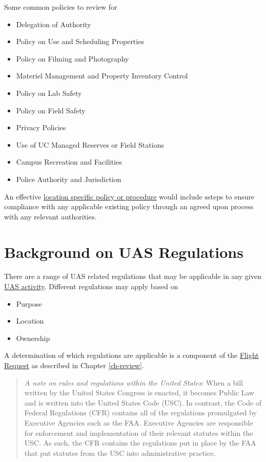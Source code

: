 \documentclass[
]{book}
\providecommand{\tightlist}{%
  \setlength{\itemsep}{0pt}\setlength{\parskip}{0pt}}
\begin{document}
Some common policies to review for

\begin{itemize}
\tightlist
\item
  Delegation of Authority
\item
  Policy on Use and Scheduling Properties
\item
  Policy on Filming and Photography
\item
  Materiel Management and Property Inventory Control
\item
  Policy on Lab Safety
\item
  Policy on Field Safety
\item
  Privacy Policies
\item
  Use of UC Managed Reserves or Field Stations
\item
  Campus Recreation and Facilities
\item
  Police Authority and Jurisdiction
\end{itemize}

An effective \protect\hyperlink{LSP}{location specific policy or procedure} would include ssteps to ensure compliance with any applicable existing policy through an agreed upon process with any relevant authorities.

\hypertarget{ch-UASregs}{%
\chapter{Background on UAS Regulations}\label{ch-UASregs}}

There are a range of UAS related regulations that may be applicable in any given \protect\hyperlink{UASactivity}{UAS activity}. Different regulations may apply based on

\begin{itemize}
\tightlist
\item
  Purpose
\item
  Location
\item
  Ownership
\end{itemize}

A determination of which regulations are applicable is a component of the \protect\hyperlink{FR}{Flight Request} as described in Chapter \ref{ch-review}.

\begin{quote}
\emph{A note on rules and regulations within the United States}: When a bill written by the United States Congress is enacted, it becomes Public Law and is written into the United States Code (USC). In contrast, the Code of Federal Regulations (CFR) contains all of the regulations promulgated by Executive Agencies such as the FAA. Executive Agencies are responsible for enforcement and implementation of their relevant statutes within the USC. As such, the CFR contains the regulations put in place by the FAA that put statutes from the USC into administrative practice.
\end{quote}
\end{document}
